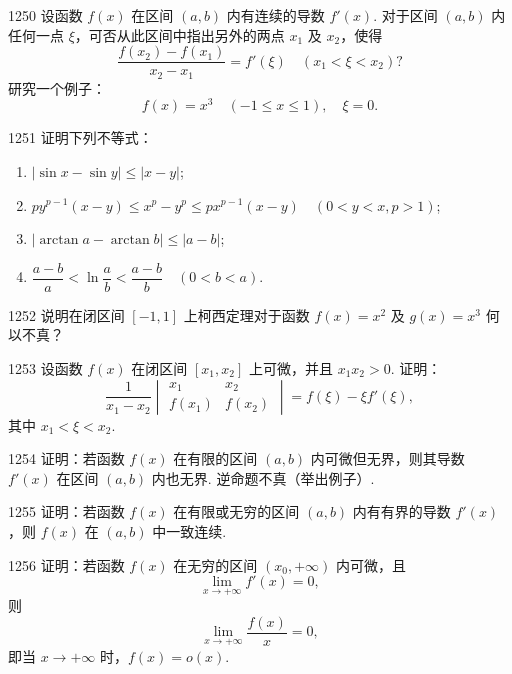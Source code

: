 \begin{prob}[M]{1250}
设函数 $f(x)$ 在区间 $(a, b)$ 内有连续的导数 $f'(x)$. 对于区间 $(a, b)$ 内任何一点 $\xi$，可否从此区间中指出另外的两点 $x_1$ 及 $x_2$，使得
\[
\frac{f(x_2) - f(x_1)}{x_2 - x_1} = f'(\xi) \quad (x_1 < \xi < x_2)?
\]
研究一个例子：
\[
f(x) = x^3 \quad (-1 \leqslant x \leqslant 1), \quad \xi = 0.
\]
\end{prob}

\begin{prob}[L]{1251}
证明下列不等式：
\begin{enumerate}[label=(\alph*), itemsep=2pt, topsep=3pt]
  \item $|\sin x - \sin y| \leqslant |x - y|$;
  \item $p y^{p-1}(x - y) \leqslant x^p - y^p \leqslant p x^{p-1}(x - y) \quad (0 < y < x, p > 1)$;
  \item $|\arctan a - \arctan b| \leqslant |a - b|$;
  \item $\dfrac{a - b}{a} < \ln \dfrac{a}{b} < \dfrac{a - b}{b} \quad (0 < b < a)$.
\end{enumerate}
\end{prob}

\begin{prob}[S]{1252}
说明在闭区间 $[-1, 1]$ 上柯西定理对于函数 $f(x) = x^2$ 及 $g(x) = x^3$ 何以不真？
\end{prob}

\begin{prob}[M]{1253}
设函数 $f(x)$ 在闭区间 $[x_1, x_2]$ 上可微，并且 $x_1 x_2 > 0$. 证明：
\[
\frac{1}{x_1 - x_2}
\begin{vmatrix}
x_1 & x_2 \\
f(x_1) & f(x_2)
\end{vmatrix}
= f(\xi) - \xi f'(\xi),
\]
其中 $x_1 < \xi < x_2$.
\end{prob}

\begin{prob}[M]{1254}
证明：若函数 $f(x)$ 在有限的区间 $(a, b)$ 内可微但无界，则其导数 $f'(x)$ 在区间 $(a, b)$ 内也无界. 逆命题不真（举出例子）.
\end{prob}

\begin{prob}[M]{1255}
证明：若函数 $f(x)$ 在有限或无穷的区间 $(a, b)$ 内有有界的导数 $f'(x)$，则 $f(x)$ 在 $(a, b)$ 中一致连续.
\end{prob}

\begin{prob}[M]{1256}
证明：若函数 $f(x)$ 在无穷的区间 $(x_0, +\infty)$ 内可微，且
\[
\lim_{x \to +\infty} f'(x) = 0,
\]
则
\[
\lim_{x \to +\infty} \frac{f(x)}{x} = 0,
\]
即当 $x \to +\infty$ 时，$f(x) = o(x)$.
\end{prob}


